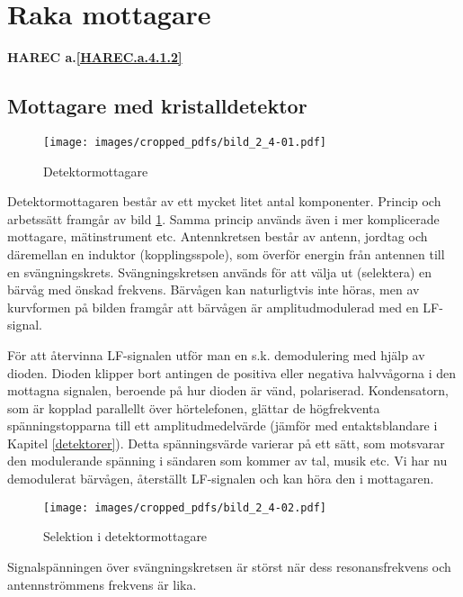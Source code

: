 \section{Raka mottagare}
\textbf{HAREC a.\ref{HAREC.a.4.1.2}\label{myHAREC.a.4.1.2}}

\subsection{Mottagare med kristalldetektor}

\begin{figure}
  \texttt{[image: images/cropped\_pdfs/bild\_2\_4-01.pdf]}
  \caption{Detektormottagare}
  \label{fig:bildII4-1}
\end{figure}

Detektormottagaren består av ett mycket litet antal komponenter.
Princip och arbetssätt framgår av bild \ref{fig:bildII4-1}.
Samma princip används även i mer komplicerade mottagare, mätinstrument etc.
Antennkretsen består av antenn, jordtag och däremellan en induktor
(kopplingsspole), som överför energin från antennen till en svängningskrets.
Svängningskretsen används för att välja ut (selektera)
en bärvåg med önskad frekvens.
Bärvågen kan naturligtvis inte höras, men av kurvformen på bilden framgår
att bärvågen är amplitudmodulerad med en LF-signal.

För att återvinna LF-signalen utför man en s.k. demodulering med hjälp
av dioden.
Dioden klipper bort antingen de positiva eller negativa halvvågorna i den
mottagna signalen, beroende på hur dioden är vänd, polariserad.
Kondensatorn, som är kopplad parallellt över hörtelefonen, glättar de
högfrekventa spänningstopparna till ett amplitudmedelvärde (jämför med
entaktsblandare i Kapitel \ref{detektorer}).
Detta spänningsvärde varierar på ett sätt, som motsvarar den modulerande
spänning i sändaren som kommer av tal, musik etc.
Vi har nu demodulerat bärvågen, återställt LF-signalen och kan höra den i
mottagaren.

\begin{wrapfigure}{R}{0.5\textwidth}
  \texttt{[image: images/cropped\_pdfs/bild\_2\_4-02.pdf]}
  \caption{Selektion i detektormottagare}
  \label{fig:bildII4-2}
\end{wrapfigure}

Signalspänningen över svängningskretsen är störst när dess
resonansfrekvens och antennströmmens frekvens är lika.

